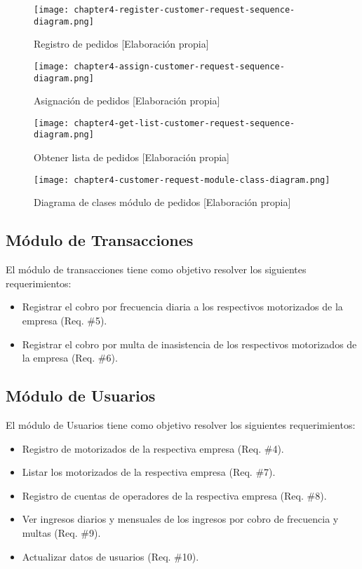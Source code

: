 \begin{figure}[H]
  \centering
  \texttt{[image: chapter4-register-customer-request-sequence-diagram.png]}
  \caption{Registro de pedidos [Elaboración propia]}  
\end{figure}

\begin{figure}[H]
  \centering
  \texttt{[image: chapter4-assign-customer-request-sequence-diagram.png]}
  \caption{Asignación de pedidos [Elaboración propia]}  
\end{figure}

\begin{figure}[H]
  \centering
  \texttt{[image: chapter4-get-list-customer-request-sequence-diagram.png]}
  \caption{Obtener lista de pedidos [Elaboración propia]}  
\end{figure}


\begin{figure}[H]
  \centering
  \texttt{[image: chapter4-customer-request-module-class-diagram.png]}
  \caption{Diagrama de clases módulo de pedidos [Elaboración propia]}  
\end{figure}

\subsection{Módulo de Transacciones}
El módulo de transacciones tiene como objetivo resolver los siguientes requerimientos:
\begin{itemize}
\item Registrar el cobro por frecuencia diaria a los respectivos motorizados de la empresa (Req. \#5).
\item Registrar el cobro por multa de inasistencia de los respectivos motorizados de la empresa (Req. \#6).
\end{itemize}
\subsection{Módulo de Usuarios}
El módulo de Usuarios tiene como objetivo resolver los siguientes requerimientos:
\begin{itemize}
\item Registro de motorizados de la respectiva empresa (Req. \#4).
\item Listar los motorizados de la respectiva empresa (Req. \#7).
\item Registro de cuentas de operadores de la respectiva empresa (Req. \#8).
\item Ver ingresos diarios y mensuales de los ingresos por cobro de frecuencia y multas (Req. \#9).
\item Actualizar datos de usuarios (Req. \#10).
\end{itemize}
